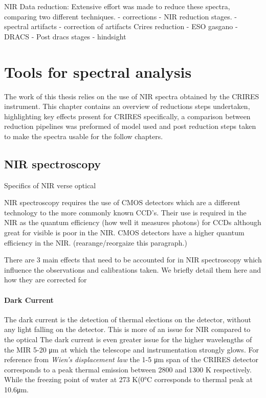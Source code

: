 %


NIR Data reduction:
Extensive effort was made to reduce these spectra, comparing two different techniques.
- corrections
- NIR reduction stages.
- spectral artifacts
- correction of artifacts
Crires reduction
- ESO gasgano
- DRACS
- Post dracs stages
- hindsight 



\chapter{Tools for spectral analysis}  %
\label{cha:reduction} 

The work of this thesis relies on the use of NIR spectra obtained by the CRIRES instrument. This chapter contains an overview of reductions steps undertaken, highlighting key effects present for CRIRES specifically, a comparison between reduction pipelines was preformed of model used and post reduction steps taken to make the spectra usable for the follow chapters.  

\section{NIR spectroscopy}
Specifics of NIR verse optical

NIR spectroscopy requires the use of CMOS detectors which are a different technology to the more commonly known CCD's. Their use is required in the NIR as the quantum efficiency (how well it measures photons) for CCDs although great for visible is poor in the NIR. CMOS detectors have a higher quantum efficiency in the NIR. 
\change(rearange/reorgaize this paragraph.)

There are 3 main effects that need to be accounted for in NIR spectroscopy which influence the observations and calibrations taken. We briefly detail them here and how they are corrected for

\subsubsection{Dark Current}
The dark current is the detection of thermal elections on the detector, without any light falling on the detector. This is more of an issue for NIR compared to the optical  The dark current is even greater issue for the higher wavelengths of the MIR 5-20  \si{\micro\meter} at which the telescope and instrumentation strongly glows. 
For reference from \emph{Wien's displacement law} the 1-5 \si{\micro\meter} span of the CRIRES detector corresponds to a peak thermal emission between 2800 and 1300 K respectively.  
While the freezing point of water at 273 K(0\si{\celsius} corresponds to thermal peak at 10.6\si{\micro\meter}.


